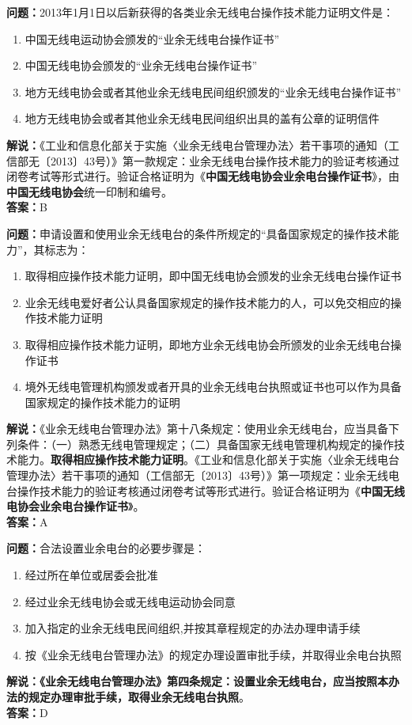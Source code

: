 \noindent\textbf{问题：}2013年1月1日以后新获得的各类业余无线电台操作技术能力证明文件是：
\begin{enumerate}[label=\Alph*), leftmargin=3em]
	\item 中国无线电运动协会颁发的“业余无线电台操作证书”
	\item 中国无线电协会颁发的“业余无线电台操作证书”
	\item 地方无线电协会或者其他业余无线电民间组织颁发的“业余无线电台操作证书”
	\item 地方无线电协会或者其他业余无线电民间组织出具的盖有公章的证明信件
\end{enumerate}
\noindent\textbf{解说：}《工业和信息化部关于实施〈业余无线电台管理办法〉若干事项的通知（工信部无〔2013〕43号）》第一款规定：业余无线电台操作技术能力的验证考核通过闭卷考试等形式进行。验证合格证明为《\textbf{中国无线电协会业余电台操作证书}》，由\textbf{中国无线电协会}统一印制和编号。\\\noindent\textbf{答案：}B



\bigskip


\noindent\textbf{问题：}申请设置和使用业余无线电台的条件所规定的“具备国家规定的操作技术能力”，其标志为：
\begin{enumerate}[label=\Alph*), leftmargin=3em]
	\item 取得相应操作技术能力证明，即中国无线电协会颁发的业余无线电台操作证书
	\item 业余无线电爱好者公认具备国家规定的操作技术能力的人，可以免交相应的操作技术能力证明
	\item 取得相应操作技术能力证明，即地方业余无线电协会所颁发的业余无线电台操作证书
	\item 境外无线电管理机构颁发或者开具的业余无线电台执照或证书也可以作为具备国家规定的操作技术能力的证明
\end{enumerate}
\noindent\textbf{解说：}《业余无线电台管理办法》第十八条规定：使用业余无线电台，应当具备下列条件：（一）熟悉无线电管理规定；（二）具备国家无线电管理机构规定的操作技术能力。\textbf{取得相应操作技术能力证明}。《工业和信息化部关于实施〈业余无线电台管理办法〉若干事项的通知（工信部无〔2013〕43号）》第一项规定：业余无线电台操作技术能力的验证考核通过闭卷考试等形式进行。验证合格证明为《\textbf{中国无线电协会业余电台操作证书}》。\\\noindent\textbf{答案：}A


\bigskip


\noindent\textbf{问题：}合法设置业余电台的必要步骤是：
\begin{enumerate}[label=\Alph*), leftmargin=3em]	
	\item 经过所在单位或居委会批准
	\item 经过业余无线电协会或无线电运动协会同意
	\item 加入指定的业余无线电民间组织,并按其章程规定的办法办理申请手续
	\item 按《业余无线电台管理办法》的规定办理设置审批手续，并取得业余电台执照
\end{enumerate}
\noindent\textbf{解说：}\textbf{《业余无线电台管理办法》第四条规定：设置业余无线电台，应当按照本办法的规定办理审批手续，取得业余无线电台执照}。\\\noindent\textbf{答案：}D



